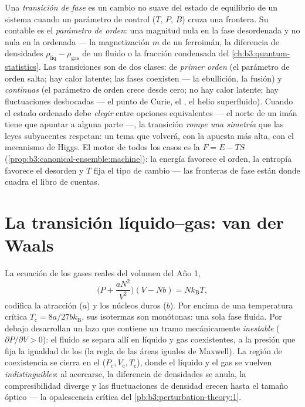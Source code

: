 \begin{definition}\label{def:b3:phase-transitions:order}
Una \emph{transición de fase} es un cambio no suave del estado de
equilibrio de un sistema cuando un parámetro de control ($T$, $P$, $B$) cruza una
frontera. Su contable es el \emph{parámetro de orden}: una magnitud
nula en la fase desordenada y no nula en la ordenada --- la
magnetización $m$ de un ferroimán, la diferencia de densidades
$\rho_{\text{liq}} - \rho_{\text{gas}}$ de un fluido o la fracción
condensada del \cref{ch:b3:quantum-statistics}. Las transiciones son de
dos clases: de \emph{primer orden} (el parámetro de orden salta; hay calor
latente; las fases coexisten --- la ebullición, la fusión) y \emph{continuas} (el
parámetro de orden crece desde cero; no hay calor latente; hay fluctuaciones
desbocadas --- el punto de Curie, el , el helio superfluido). Cuando el
estado ordenado debe \emph{elegir} entre opciones equivalentes --- el
norte de un imán tiene que apuntar a alguna parte ---, la transición
\emph{rompe una simetría} que las leyes subyacentes respetan: un tema
que volverá, con la apuesta más alta, con el mecanismo de Higgs.
El motor de todos los casos es la  $F = E - TS$
(\cref{prop:b3:canonical-ensemble:machine}): la energía favorece el orden,
la entropía favorece el desorden y $T$ fija el tipo de cambio --- las fronteras
de fase están donde cuadra el libro de cuentas.
\end{definition}

\section{La transición líquido--gas: van der Waals}

\begin{proposition}\label{prop:b3:phase-transitions:vdw}
La ecuación de los gases reales del volumen del Año 1,
\[
\Big(P + \frac{aN^2}{V^2}\Big)(V - Nb) = Nk_{\text{B}}T ,
\]
codifica la atracción ($a$) y los núcleos duros ($b$). Por encima de una
temperatura crítica $T_{\text{c}} = 8a/27bk_{\text{B}}$, sus isotermas son
monótonas: una sola fase fluida. Por debajo desarrollan un lazo que contiene
un tramo mecánicamente \emph{inestable} ($\partial P/\partial V >
0$): el fluido se separa allí en líquido y gas coexistentes, a la
presión que fija la igualdad de los  (la regla de las
áreas iguales de Maxwell). La región de coexistencia se cierra en el  ($P_{\text{c}}, V_{\text{c}}, T_{\text{c}}$), donde el líquido
y el gas se vuelven \emph{indistinguibles}: al acercarse, la
diferencia de densidades se anula, la compresibilidad diverge y las
fluctuaciones de densidad crecen hasta el tamaño óptico --- la
opalescencia crítica del \cref{pb:b3:perturbation-theory:1}.
\end{proposition}
\admitted

